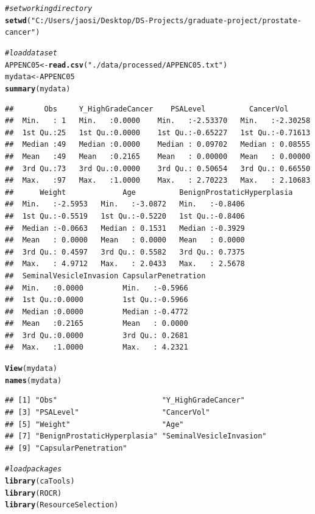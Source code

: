 \documentclass{article}\usepackage[]{graphicx}\usepackage[]{color}
\makeatletter
\newcommand{\hlstr}[1]{\textcolor[rgb]{0.192,0.494,0.8}{#1}}%
\newcommand{\hlcom}[1]{\textcolor[rgb]{0.678,0.584,0.686}{\textit{#1}}}%
\newcommand{\hlstd}[1]{\textcolor[rgb]{0.345,0.345,0.345}{#1}}%
\newcommand{\hlkwb}[1]{\textcolor[rgb]{0.69,0.353,0.396}{#1}}%
\newcommand{\hlkwd}[1]{\textcolor[rgb]{0.737,0.353,0.396}{\textbf{#1}}}%
\newenvironment{kframe}{%
 \def\at@end@of@kframe{}%
 \ifinner\ifhmode%
  \def\at@end@of@kframe{\end{minipage}}%
  \begin{minipage}{\columnwidth}%
 \fi\fi%
 \def\FrameCommand##1{\hskip\@totalleftmargin \hskip-\fboxsep
 \colorbox{shadecolor}{##1}\hskip-\fboxsep
     \hskip-\linewidth \hskip-\@totalleftmargin \hskip\columnwidth}%
 \MakeFramed {\advance\hsize-\width
   \@totalleftmargin\z@ \linewidth\hsize
   \@setminipage}}%
 {\par\unskip\endMakeFramed%
 \at@end@of@kframe}
\newenvironment{knitrout}{}{} %
\makeatother
\begin{document}
\begin{knitrout}
\color{fgcolor}\begin{kframe}
\begin{alltt}
\hlcom{# set working directory}
\hlkwd{setwd}\hlstd{(}\hlstr{"C:/Users/jaosi/Desktop/DS-Projects/graduate-project/prostate-cancer"}\hlstd{)}

\hlcom{# load dataset}
\hlstd{APPENC05} \hlkwb{<-} \hlkwd{read.csv}\hlstd{(}\hlstr{"./data/processed/APPENC05.txt"}\hlstd{)}
\hlstd{mydata} \hlkwb{<-} \hlstd{APPENC05}
\hlkwd{summary}\hlstd{(mydata)}
\end{alltt}
\begin{verbatim}
##       Obs     Y_HighGradeCancer    PSALevel          CancerVol       
##  Min.   : 1   Min.   :0.0000    Min.   :-2.53370   Min.   :-2.30258  
##  1st Qu.:25   1st Qu.:0.0000    1st Qu.:-0.65227   1st Qu.:-0.71613  
##  Median :49   Median :0.0000    Median : 0.09702   Median : 0.08555  
##  Mean   :49   Mean   :0.2165    Mean   : 0.00000   Mean   : 0.00000  
##  3rd Qu.:73   3rd Qu.:0.0000    3rd Qu.: 0.50654   3rd Qu.: 0.66550  
##  Max.   :97   Max.   :1.0000    Max.   : 2.70223   Max.   : 2.10683  
##      Weight             Age          BenignProstaticHyperplasia
##  Min.   :-2.5953   Min.   :-3.0872   Min.   :-0.8406           
##  1st Qu.:-0.5519   1st Qu.:-0.5220   1st Qu.:-0.8406           
##  Median :-0.0663   Median : 0.1531   Median :-0.3929           
##  Mean   : 0.0000   Mean   : 0.0000   Mean   : 0.0000           
##  3rd Qu.: 0.4597   3rd Qu.: 0.5582   3rd Qu.: 0.7375           
##  Max.   : 4.9712   Max.   : 2.0433   Max.   : 2.5678           
##  SeminalVesicleInvasion CapsularPenetration
##  Min.   :0.0000         Min.   :-0.5966    
##  1st Qu.:0.0000         1st Qu.:-0.5966    
##  Median :0.0000         Median :-0.4772    
##  Mean   :0.2165         Mean   : 0.0000    
##  3rd Qu.:0.0000         3rd Qu.: 0.2681    
##  Max.   :1.0000         Max.   : 4.2321
\end{verbatim}
\begin{alltt}
\hlkwd{View}\hlstd{(mydata)}
\hlkwd{names}\hlstd{(mydata)}
\end{alltt}
\begin{verbatim}
## [1] "Obs"                        "Y_HighGradeCancer"         
## [3] "PSALevel"                   "CancerVol"                 
## [5] "Weight"                     "Age"                       
## [7] "BenignProstaticHyperplasia" "SeminalVesicleInvasion"    
## [9] "CapsularPenetration"
\end{verbatim}
\begin{alltt}
\hlcom{# load packages}
\hlkwd{library}\hlstd{(caTools)}
\hlkwd{library}\hlstd{(ROCR)}
\hlkwd{library}\hlstd{(ResourceSelection)}
\end{alltt}



\end{kframe}
\end{knitrout}
\end{document}
